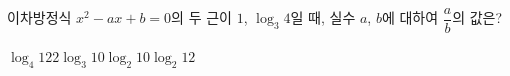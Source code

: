 이차방정식 $x^2-ax+b=0$의 두 근이 $1$, $\log_3 4$일 때, 실수 $a$, $b$에 대하여 $\dfrac{a}{b}$의 값은?
\begin{choices32}{$\log_4 12$}{$2$}{$\log_3 10$}{$\log_2 10$}{$\log_2 12$}\end{choices32}
